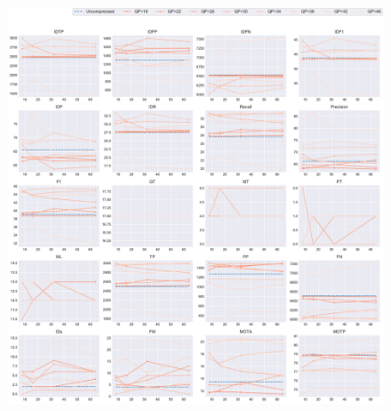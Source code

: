 \begin{figure}[!htbp]
\centering
\includegraphics[width=1.0\linewidth]{img/appendix/KristenAndSara_all_multiplots_msr.pdf}
\caption[Result of all object classes in Class E KristenAndSara with Horizontal Axis of MSR]{}
\label{fig:KristenAndSara_all_msr}
\end{figure}



